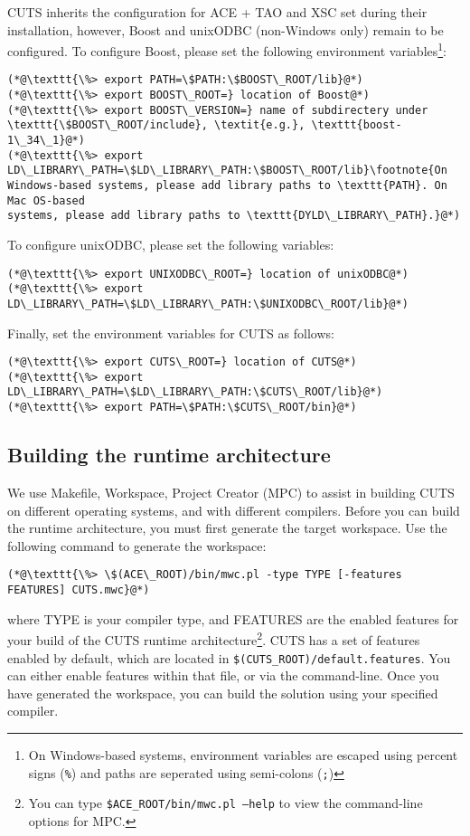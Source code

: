 CUTS inherits the configuration for ACE + TAO and XSC set during their installation,
however, Boost and unixODBC (non-Windows only) remain to be configured. To configure
Boost, please set the following environment variables\footnote{On Windows-based systems,
environment variables are escaped using percent signs (\texttt{\%}) and paths are 
seperated using semi-colons (\texttt{;})}:

\begin{lstlisting}
(*@\texttt{\%> export PATH=\$PATH:\$BOOST\_ROOT/lib}@*)
(*@\texttt{\%> export BOOST\_ROOT=} location of Boost@*)
(*@\texttt{\%> export BOOST\_VERSION=} name of subdirectery under \texttt{\$BOOST\_ROOT/include}, \textit{e.g.}, \texttt{boost-1\_34\_1}@*)
(*@\texttt{\%> export LD\_LIBRARY\_PATH=\$LD\_LIBRARY\_PATH:\$BOOST\_ROOT/lib}\footnote{On
Windows-based systems, please add library paths to \texttt{PATH}. On Mac OS-based
systems, please add library paths to \texttt{DYLD\_LIBRARY\_PATH}.}@*)
\end{lstlisting}
To configure unixODBC, please set the following variables:
\begin{lstlisting}
(*@\texttt{\%> export UNIXODBC\_ROOT=} location of unixODBC@*)
(*@\texttt{\%> export LD\_LIBRARY\_PATH=\$LD\_LIBRARY\_PATH:\$UNIXODBC\_ROOT/lib}@*)
\end{lstlisting}
Finally, set the environment variables for CUTS as follows:
\begin{lstlisting}
(*@\texttt{\%> export CUTS\_ROOT=} location of CUTS@*)
(*@\texttt{\%> export LD\_LIBRARY\_PATH=\$LD\_LIBRARY\_PATH:\$CUTS\_ROOT/lib}@*)
(*@\texttt{\%> export PATH=\$PATH:\$CUTS\_ROOT/bin}@*)
\end{lstlisting}

\subsection{Building the runtime architecture}

We use Makefile, Workspace, Project Creator (MPC) to assist in building CUTS
on different operating systems, and with different compilers. Before you can
build the runtime architecture, you must first generate the target workspace.
Use the following command to generate the workspace:
\begin{lstlisting}
(*@\texttt{\%> \$(ACE\_ROOT)/bin/mwc.pl -type TYPE [-features FEATURES] CUTS.mwc}@*)
\end{lstlisting}
where TYPE is your compiler type, and FEATURES are the enabled features
for your build of the CUTS runtime architecture\footnote{You can type 
\texttt{\$ACE\_ROOT/bin/mwc.pl --help} to view the command-line options for 
MPC.}. CUTS has a set of features enabled by default, which are located 
in \texttt{\$(CUTS\_ROOT)/default.features}. You can either enable features 
within that file, or via the command-line. Once you have generated the 
workspace, you can build the solution using your specified compiler.

